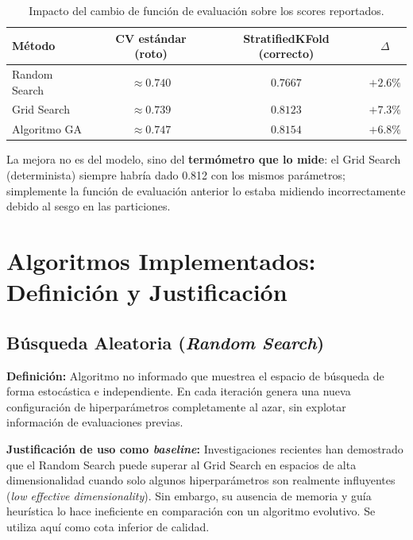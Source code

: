 \documentclass[12pt, a4paper]{article}
\begin{document}
\renewcommand{\arraystretch}{1.3}
\begin{table}[H]
  \centering
  \caption{Impacto del cambio de función de evaluación sobre los scores reportados.}
  \label{tab:impacto_cv}
  \begin{tabular}{lccc}
    \toprule
    \textbf{Método} & \textbf{CV estándar (roto)} & \textbf{StratifiedKFold (correcto)} & \textbf{$\Delta$} \\
    \midrule
    Random Search   & $\approx 0.740$ & $0.7667$ & $+2.6\%$ \\
    Grid Search     & $\approx 0.739$ & $0.8123$ & $+7.3\%$ \\
    Algoritmo GA    & $\approx 0.747$ & $\mathbf{0.8154}$ & $+6.8\%$ \\
    \bottomrule
  \end{tabular}
\end{table}
\renewcommand{\arraystretch}{1}

La mejora no es del modelo, sino del \textbf{termómetro que lo mide}: el Grid Search
(determinista) siempre habría dado 0.812 con los mismos parámetros; simplemente la
función de evaluación anterior lo estaba midiendo incorrectamente debido al sesgo en
las particiones.

\section{Algoritmos Implementados: Definición y Justificación}

\subsection{Búsqueda Aleatoria (\textit{Random Search})}

\textbf{Definición:} Algoritmo no informado que muestrea el espacio de búsqueda de forma
estocástica e independiente. En cada iteración genera una nueva configuración de
hiperparámetros completamente al azar, sin explotar información de evaluaciones previas.

\textbf{Justificación de uso como \textit{baseline}:} Investigaciones recientes han
demostrado que el Random Search puede superar al Grid Search en espacios de alta
dimensionalidad cuando solo algunos hiperparámetros son realmente influyentes
(\textit{low effective dimensionality}). Sin embargo, su ausencia de memoria y guía
heurística lo hace ineficiente en comparación con un algoritmo evolutivo. Se utiliza
aquí como cota inferior de calidad.
\end{document}
